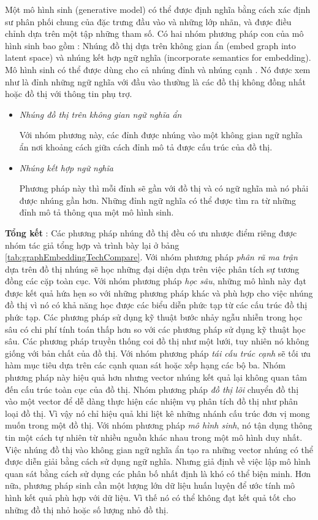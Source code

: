 Một mô hình sinh (generative model) có thể được định nghĩa bằng cách xác định sư phân phối chung của đặc trưng đầu vào và những lớp nhãn, và được điều chỉnh dựa trên một tập những tham số. Có hai nhóm phương pháp con của mô hình sinh bao gồm : Nhúng đồ thị dựa trên không gian ẩn (embed graph into latent space) và nhúng kết hợp ngữ nghĩa (incorporate semantics for embedding).
Mô hình sinh có thể được dùng cho cả nhúng đỉnh và nhúng cạnh . Nó được xem như là đỉnh những ngữ nghĩa với đầu vào thường là các đồ thị không đồng nhất hoặc đồ thị với thông tin phụ trợ.
\begin{itemize}
	\item \textit{Nhúng đồ thị trên không gian ngữ nghĩa ẩn}
	
	Với nhóm phương này, các đỉnh được nhúng vào một không gian ngữ nghĩa ẩn nơi khoảng cách giữa cách đỉnh mô tả được cấu trúc của đồ thị.
	
	\item \textit{Nhúng kết hợp ngữ nghĩa}
	
	Phương pháp này thì mỗi đỉnh sẽ gần với đồ thị và có ngữ nghĩa mà nó phải được nhúng gần hơn. Những đỉnh ngữ nghĩa có thể được tìm ra từ những đỉnh mô tả thông qua một mô hình sinh.
	
\end{itemize}

\textbf{Tổng kết} : Các phương pháp nhúng đồ thị đều có ưu nhược điểm riêng được nhóm tác giả \cite{cai2018comprehensive} tổng hợp và trình bày lại ở bảng \ref{tab:graphEmbeddingTechCompare}. Với nhóm phương pháp \textit{phân rã ma trận} dựa trên đồ thị nhúng sẽ học những đại diện dựa trên việc phân tích sự tương đồng các cặp toàn cục. Với nhóm phương pháp \textit{học sâu}, những mô hình này đạt được kết quả hứa hẹn so với những phương pháp khác và phù hợp cho việc nhúng đồ thị vì nó có khả năng học được các biểu diễn phức tạp từ các cấu trúc đồ thị phức tạp. Các phương pháp sử dụng kỹ thuật bước nhảy ngẫu nhiễn trong học sâu có chi phí tính toán thấp hơn so với các phương pháp sử dụng kỹ thuật học sâu. Các phương pháp truyền thống coi đồ thị như một lưới, tuy nhiên nó không giống với bản chất của đồ thị. Với nhóm phương pháp \textit{tái cấu trúc cạnh} sẽ tối ưu hàm mục tiêu dựa trên các cạnh quan sát hoặc xếp hạng các bộ ba. Nhóm phương pháp này hiệu quả hơn nhưng vector nhúng kết quả lại không quan tâm đến cấu trúc toàn cục của đồ thị. Nhóm phương pháp \textit{đồ thị lõi} chuyển đồ thị vào một vector để dễ dàng thực hiện các nhiệm vụ phân tích đồ thị như phân loại đồ thị. Vì vậy nó chỉ hiệu quả khi liệt kê những nhánh cấu trúc đơn vị mong muốn trong một đồ thị. Với nhóm phương pháp \textit{mô hình sinh}, nó tận dụng thông tin một cách tự nhiên từ nhiều nguồn khác nhau trong một mô hình duy nhất. Việc nhúng đồ thị vào không gian ngữ nghĩa ẩn tạo ra những vector nhúng có thể được diễn giải bằng cách sử dụng ngữ nghĩa. Nhưng giả định về việc lập mô hình quan sát bằng cách sử dụng các phân bố nhất định là khó có thể biện minh. Hơn nữa, phương pháp sinh cần một lượng lớn dữ liệu huấn luyện để ước tính mô hình kết quả phù hợp với dữ liệu. Vì thế nó có thể không đạt kết quả tốt cho những đồ thị nhỏ hoặc số lượng nhỏ đồ thị.

